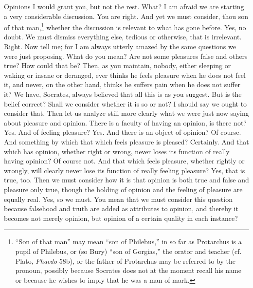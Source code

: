 \documentclass[letterpaper,12pt]{article}
\newcommand{\stephpag}[1]{\marginnote{\small\itshape\fontfamily{ppl}\selectfont #1}}
\begin{document}
\begin{drama}
\protarchusspeaks
Opinions I would grant you, but not the rest.
\socratesspeaks
What? I am afraid we are starting a very considerable discussion.
\protarchusspeaks
You are right.
\socratesspeaks
And yet we must consider, thou son of that man,\footnote{``Son of that man'' may mean ``son of Philebus,'' in so far as Protarchus is a pupil of Philebus, or (so Bury) ``son of Gorgias,'' the orator and teacher (cf. Plato, \emph{Phaedo} 58b), or the father of Protarchus may be referred to by the pronoun, possibly because Socrates does not at the moment recall his name or because he wishes to imply that he was a man of mark.} whether the discussion is relevant to what has gone before.
\protarchusspeaks
Yes, no doubt.
\socratesspeaks
We must dismiss everything else, tedious or otherwise, that is irrelevant.
\protarchusspeaks
Right. \stephpag{e}
\socratesspeaks
Now tell me; for I am always utterly amazed by the same questions we were just proposing.
\protarchusspeaks
What do you mean?
\socratesspeaks
Are not some pleasures false and others true?
\protarchusspeaks
How could that be?
\socratesspeaks
Then, as you maintain, nobody, either sleeping or waking or insane or deranged, ever thinks he feels pleasure when he does not feel it, and never, on the other hand, thinks he suffers pain when he does not suffer it?
\protarchusspeaks
We have, Socrates, always believed that all this is as you suggest.
\socratesspeaks
But is the belief correct? Shall we consider whether it is so or not? \stephpag{37 a}
\protarchusspeaks
I should say we ought to consider that.
\socratesspeaks
Then let us analyze still more clearly what we were just now saying about pleasure and opinion. There is a faculty of having an opinion, is there not?
\protarchusspeaks
Yes.
\socratesspeaks
And of feeling pleasure?
\protarchusspeaks
Yes.
\socratesspeaks
And there is an object of opinion?
\protarchusspeaks
Of course.
\socratesspeaks
And something by which that which feels pleasure is pleased?
\protarchusspeaks
Certainly.
\socratesspeaks
And that which has opinion, whether right or wrong, never loses its function of really having opinion? \stephpag{b}
\protarchusspeaks
Of course not.
\socratesspeaks
And that which feels pleasure, whether rightly or wrongly, will clearly never lose its function of really feeling pleasure?
\protarchusspeaks
Yes, that is true, too.
\socratesspeaks
Then we must consider how it is that opinion is both true and false and pleasure only true, though the holding of opinion and the feeling of pleasure are equally real.
\protarchusspeaks
Yes, so we must.
\socratesspeaks
You mean that we must consider this question because falsehood and truth are added as attributes to opinion, \stephpag{c} and thereby it becomes not merely opinion, but opinion of a certain quality in each instance?

\end{drama}
\end{document}
